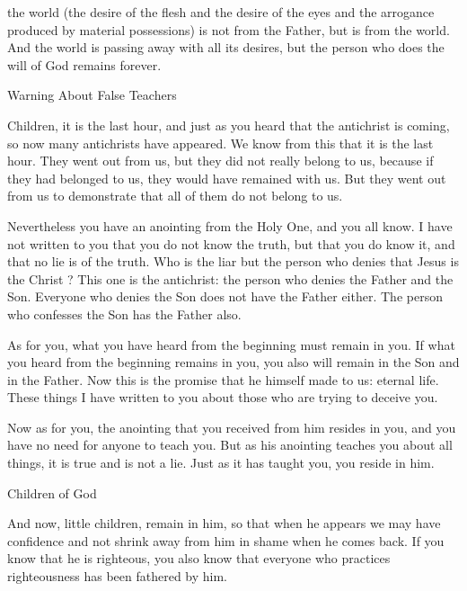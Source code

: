 {the world
(the desire
of the flesh
and
the
desire
of the
eyes
and
the arrogance
produced by material possessions) is
not
from
the Father,
but
is
from
the world.
And
the world
is passing away
with all its
desires,
but
the person who does
the will
of God
remains
forever.
\par }{\SH Warning About False Teachers
\par }{\PP {}Children,
it is
the last
hour,
and
just as
you heard
that
the antichrist
is coming,
so
now
many
antichrists
have appeared.
We know
from this
that
it is
the last
hour.
They went out
from
us,
but
they did
not
really belong
to us,
because
if
they had
belonged
to us,
they would have remained
with
us.
But
they went out from us to
demonstrate
that
all
of them do
not
belong
to us.
\par }{\PP {}Nevertheless you have
an anointing
from
the Holy One,
and you
all
know.
I have
not
written
to you
that
you do
not
know
the truth,
but
that
you do know
it,
and
that
no
lie
is
of
the truth.
Who
is
the liar
but
the person who denies
that
Jesus
is
the Christ
? This one
is
the antichrist: the person who denies
the Father
and
the Son.
Everyone
who denies
the Son
does
not
have
the Father
either. The person who confesses
the Son
has
the Father
also.
\par }{\PP {}As for you,
what
you have heard
from
the beginning
must remain
in
you.
If
what you heard
from
the beginning
remains
in
you,
you
also
will remain
in
the Son
and
in
the Father.
Now
this
is
the promise
that
he
himself
made
to us: eternal
life.
These things
I have written
to you
about
those who are trying to deceive
you.
\par }{\PP {}Now
as for you,
the anointing
that
you received
from
him
resides
in
you,
and
you have
no
need
for
anyone
to teach
you.
But
as
his
anointing
teaches
you
about
all things,
it is
true
and
is
not
a lie.
Just as
it has taught
you,
you reside in him.
\par }{\SH Children of God
\par }{\PP {}And
now,
little children,
remain
in
him,
so that
when he appears
we may have
confidence
and
not
shrink away
from
him
in shame
when he
comes back.
If
you know
that
he is
righteous,
you
also know
that
everyone
who practices
righteousness
has been fathered
by
him.

}
